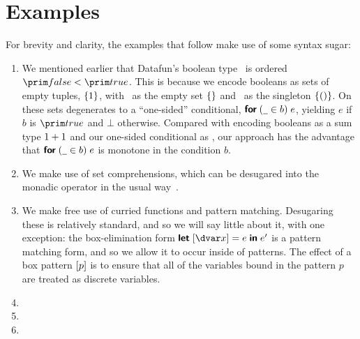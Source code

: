 \newcommand\notmember[2]{\neg \ebox{\mem \<\ebox{#1} \<{#2}}}
\renewcommand\notmember[2]{\ebox{#1} \not \in \ebox{#2}}

\section{Examples}
\label{examples}



For brevity and clarity, the examples that follow make use of some syntax sugar:

\begin{enumerate}

\item We mentioned earlier that Datafun's boolean type \tbool\ is ordered
  $\efalse < \etrue$. This is because we encode booleans as sets of empty
  tuples, $\{{1}\}$, with \efalse\ as the empty set $\{{}\}$ and
  \etrue\ as the singleton $\{{({})}\}$. On these sets 
  degenerates to a ``one-sided'' conditional, $\efor {\pwild \in b} e$, yielding
  $e$ if $b$ is $\etrue$ and $\bot$ otherwise. Compared with encoding booleans
  as a sum type \(1 + 1\) and our one-sided conditional as , our approach has
  the advantage that $\efor{\pwild \in b} e$ is monotone in the condition $b$.


\item We make use of set comprehensions, which can be desugared into the monadic
  operator  in the usual way~\citep{wadler-monad-comprehensions}.

\item We make free use of curried functions and pattern matching. Desugaring
  these is relatively standard, and so we will say little about it, with one
  exception: the box-elimination form $\eletbox x e e'$ is a pattern matching
  form, and so we allow it to occur inside of patterns. The effect of a box
  pattern $[{p}]$ is to ensure that all of the variables bound in
  the pattern $p$ are treated as discrete variables.

\item {}

\item {}

\item {}
\end{enumerate}

